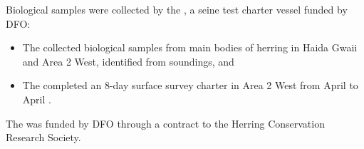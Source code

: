Biological samples were collected by the ,
a seine test charter vessel funded by DFO:

\begin{itemize}

\item The  collected biological samples from main bodies of
herring in Haida Gwaii and Area 2 West, identified from soundings, and

\item The  completed an 8-day surface survey charter in
Area 2 West from April  to April .

\end{itemize}

The  was funded by DFO through a contract to
the Herring  Conservation Research Society.